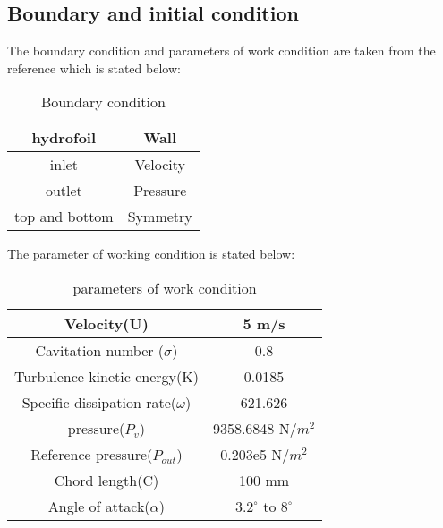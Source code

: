 \subsection{Boundary and initial condition}
The boundary condition and parameters of work condition  are taken from the reference
\cite{Zhao2021} which is stated below:
\begin{table}[h]
    \centering
    \begin{tabular}{|c|c|}
    \hline
        hydrofoil & Wall \\
    \hline
        inlet & Velocity \\ 
    \hline
       outlet & Pressure  \\
    \hline
       top and bottom & Symmetry \\
   \hline
    \end{tabular}
    \caption{Boundary condition}
    \label{tab:BC}
\end{table}
The parameter of working condition is stated below:
\begin{table}[h]
    \centering
    \begin{tabular}{|c|c|}
    \hline
        Velocity(U) & 5 m/s \\
    \hline
        Cavitation number ($\sigma$) & 0.8 \\ 
    \hline
     Turbulence kinetic energy(K) & 0.0185 \\
    \hline
    Specific dissipation rate($\omega$) & 621.626 \\
    \hline
    pressure($P_v$) & 9358.6848 N/${m}^2$\\
    \hline
    Reference pressure($P_{out}$) &  0.203e5 N/${m}^2$ \\
    \hline
    Chord length(C) & 100 mm \\
    \hline
    Angle of attack($\alpha$) & ${3.2}^{\circ}$ to ${8}^{\circ}$ \\
   \hline
    \end{tabular}
    \caption{parameters of work condition}
    \label{tab:PC}
\end{table}
